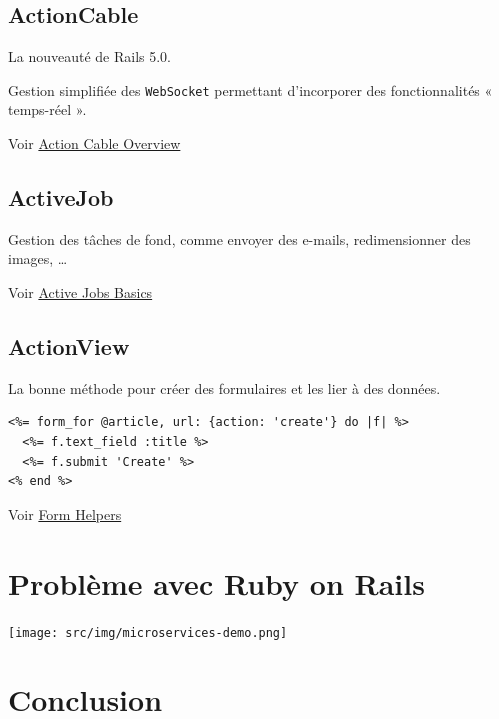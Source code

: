 \hypertarget{actioncable}{%
\subsection{ActionCable}\label{actioncable}}

La nouveauté de Rails 5.0.

Gestion simplifiée des \textenglish{\texttt{WebSocket}} permettant
d'incorporer des fonctionnalités « temps-réel ».

Voir
\href{http://guides.rubyonrails.org/action_cable_overview.html}{Action
Cable Overview}

\hypertarget{activejob}{%
\subsection{ActiveJob}\label{activejob}}

Gestion des tâches de fond, comme envoyer des e-mails, redimensionner
des images, \ldots{}

Voir \href{http://guides.rubyonrails.org/active_job_basics.html}{Active
Jobs Basics}

\hypertarget{actionview}{%
\subsection{ActionView}\label{actionview}}

La bonne méthode pour créer des formulaires et les lier à des données.

\begin{english}

\begin{verbatim}
<%= form_for @article, url: {action: 'create'} do |f| %>
  <%= f.text_field :title %>
  <%= f.submit 'Create' %>
<% end %>
\end{verbatim}

\end{english}

Voir \href{http://guides.rubyonrails.org/form_helpers.html}{Form
Helpers}

\hypertarget{probluxe8me-avec-ruby-on-rails}{%
\section{Problème avec Ruby on
Rails}\label{probluxe8me-avec-ruby-on-rails}}

\texttt{[image: src/img/microservices-demo.png]}

\hypertarget{conclusion}{%
\section{Conclusion}\label{conclusion}}

